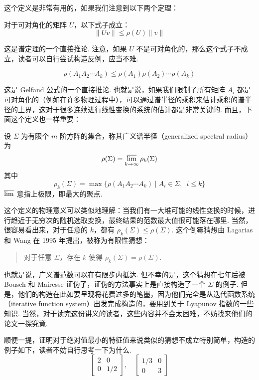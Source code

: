 这个定义是非常有用的，如果我们注意到以下两个定理：

\begin{theorem}
    对于可对角化的矩阵 $U$，以下式子成立：
    \[ \lVert Uv \rVert \leqslant \rho(U) \lVert v \rVert \]
\end{theorem}

这是谱定理的一个直接推论. 注意，如果 $U$ 不是可对角化的，那么这个式子不成立，读者可以自行尝试构造反例，应当不难.

\begin{theorem}
    \[ \rho(A_1A_2\cdots A_k) \leqslant \rho(A_1)\rho(A_2)\cdots \rho(A_k) \]
\end{theorem}

这是 Gelfand 公式的一个直接推论. 也就是说，如果我们限制了所有矩阵 $A_i$ 都是可对角化的（例如在许多物理过程中），可以通过谱半径的乘积来估计乘积的谱半径的上界，这对于很多连续进行线性变换的系统的估计都是非常关键的. 而且，下面这个定义也一样重要：

\begin{definition}[广义谱半径]
    设 $\Sigma$ 为有限个 $m$ 阶方阵的集合，称其广义谱半径（generalized spectral radius）为
    \[ \rho(\Sigma) = \varlimsup_{k \to \infty} \rho_k(\Sigma) \]
    其中
    \[ \rho_k(\Sigma) = \max\{\rho(A_1A_2 \cdots A_k) \mid A_i \in \Sigma,\enspace i \leqslant k\} \]
    $\varlimsup$ 意指上极限，即最大的聚点.
\end{definition}

这个定义的物理意义可以类似地理解：当我们有一大堆可能的线性变换的时候，进行趋近于无穷次的随机选取变换，最终结果的范数最大值很可能落在哪里. 当然，很容易看出来，对于任意的 $k$，都有 $\rho_k(\Sigma) \leqslant \rho(\Sigma)$. 这个倒霉猜想由 Lagarias 和 Wang 在 1995 年提出，被称为有限性猜想：

\begin{quote}
    \kaishu
    对于任意 $\Sigma$，存在 $k$ 使得 $\rho_k(\Sigma) = \rho(\Sigma)$.
\end{quote}

也就是说，广义谱范数可以在有限步内抵达. 但不幸的是，这个猜想在七年后被 Bousch 和 Mairesse 证伪了，证伪的方法事实上是直接构造了一个 $\Sigma$ 的例子. 但是，他们的构造在此如要呈现将花费过多的笔墨，因为他们完全是从迭代函数系统（iterative function system）出发完成构造的，要用到关于 Lyapunov 指数的一些知识. 当然，对于读完这份讲义的读者，这些内容并不会太困难，不妨找来他们的论文一探究竟.

顺便一提，证明对于绝对值最小的特征值来说类似的猜想不成立特别简单，构造的例子如下，读者不妨自行思考一下为什么.
\[
    \begin{bmatrix}
        2 & 0 \\ 0 & 1/2
    \end{bmatrix}, \quad \begin{bmatrix}
        1/3 & 0 \\ 0 & 3
    \end{bmatrix}
\]

